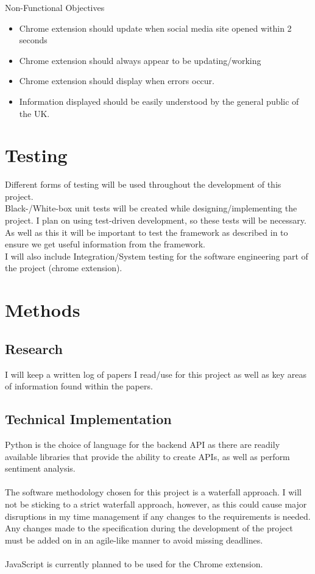 \documentclass[a4paper,fleqn,10pt]{article}
\begin{document}
Non-Functional Objectives
\begin{itemize}
    \item Chrome extension should update when social media site opened within 2 seconds
    \item Chrome extension should always appear to be updating/working
    \item Chrome extension should display when errors occur.
    \item Information displayed should be easily understood by the general public of the UK.
\end{itemize}

\section{Testing}
\label{sec:testing}
Different forms of testing will be used throughout the development of this project.\\
Black-/White-box unit tests will be created while designing/implementing the project. I plan on using test-driven development,
so these tests will be necessary.\\
As well as this it will be important to test the framework as described in  to ensure we get useful
information from the framework.\\
I will also include Integration/System testing for the software engineering part of the project (chrome extension).

\section{Methods}
\label{sec:methods}

\subsection{Research}
I will keep a written log of papers I read/use for this project as well as key areas of information found within the papers.\\

\subsection{Technical Implementation}
Python is the choice of language for the backend API as there are readily available libraries that provide the ability to
create APIs, as well as perform sentiment analysis.\\\\
The software methodology chosen for this project is a waterfall approach. I will not be sticking to a strict waterfall approach, however,
as this could cause major disruptions in my time management if any changes to the requirements is needed. Any changes made to the
specification during the development of the project must be added on in an agile-like manner to avoid missing deadlines.\\\\
JavaScript is currently planned to be used for the Chrome extension.
\end{document}
